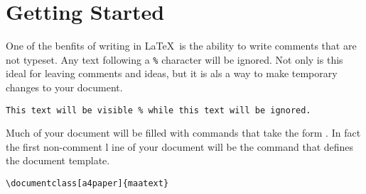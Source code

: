 \section{Getting Started}

One of the benfits of writing in \LaTeX\, is the ability to write comments
that are not typeset.  Any text following a \lstinline{%} character will be 
ignored.  Not only is this ideal for leaving comments and ideas, but it is 
als a way to make temporary changes to your document.
\lstset{style=mhotexcode}
\begin{lstlisting}[belowskip=-2 \baselineskip]
% This code will be ignored
This text will be visible % while this text will be ignored.
\end{lstlisting}
Much of your document will be filled with commands that take the form 
. In fact the first non-comment l
ine of your document will be the command that defines the document template.
\begin{lstlisting}
\documentclass[a4paper]{maatext}
\end{lstlisting}
